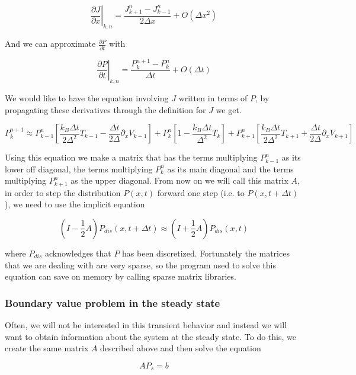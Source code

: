 \documentclass[11pt]{article} %
\begin{document}
$$ \left. \frac{\partial J}{\partial x} \right|_{k, n} = \frac{J_{k+1}^n - J_{k-1}^n}{2 \Delta x} + O(\Delta x^2) $$

And we can approximate $\frac{\partial P}{\partial t}$ with

$$ \left. \frac{\partial P}{\partial t} \right|_{k, n} = \frac{P_k^{n+1} - P_k^n}{\Delta t} + O(\Delta t) $$

We would like to have the equation involving $J$ written in terms of $P$, by propagating these derivatives through the definition for $J$ we get.

\begin{equation}
P_{k}^{n+1} \approx P_{k-1}^n \left [ \frac{k_B \Delta t}{2 \Delta^2} T_{k-1} - \frac{\Delta t}{2 \Delta} \partial_x V_{k-1} \right ] +
 P_k^n \left [1 - \frac{k_B \Delta t}{\Delta^2} T_k \right] +
 P_{k+1}^n \left [ \frac{k_B \Delta t}{2 \Delta^2}T_{k+1} + \frac{\Delta t}{2 \Delta} \partial_x V_{k+1} \right]
\end{equation}

Using this equation we make a matrix that has the terms multiplying $P_{k-1}^n$ as its lower off diagonal, the terms multiplying $P_k^n$ as its main diagonal and the terms multiplying $P_{k+1}^n$ as the upper diagonal. From now on we will call this matrix $A$, in order to step the distribution $P(x, t)$ forward one step (i.e. to $P(x, t + \Delta t)$), we need to use the implicit equation 

\begin{equation}
\left (I - \frac{1}{2} A \right) P_{dis}(x, t + \Delta t) \approx \left(I + \frac{1}{2}A \right)P_{dis}(x, t)
\end{equation}

where $P_{dis}$ acknowledges that $P$ has been discretized. Fortunately the matrices that we are dealing with are very sparse, so the program used to solve this equation can save on memory by calling sparse matrix libraries.

\subsubsection{Boundary value problem in the steady state}
Often, we will not be interested in this transient behavior and instead we will want to obtain information about the system at the steady state. To do this, we create the same matrix $A$ described above and then solve the equation

\begin{equation}
A P_s = b 
\end{equation}
\end{document}
